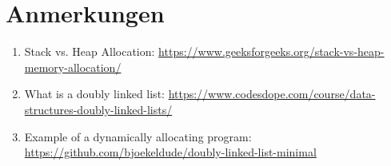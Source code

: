 \documentclass{dcbl/challenge}
\begin{document}
\section*{Anmerkungen}
\begin{enumerate}
    \item Stack vs. Heap Allocation: \url{https://www.geeksforgeeks.org/stack-vs-heap-memory-allocation/}
    \item What is a doubly linked list: \url{https://www.codesdope.com/course/data-structures-doubly-linked-lists/}
    \item Example of a dynamically allocating program: \url{https://github.com/bjoekeldude/doubly-linked-list-minimal}
\end{enumerate}
\end{document}
